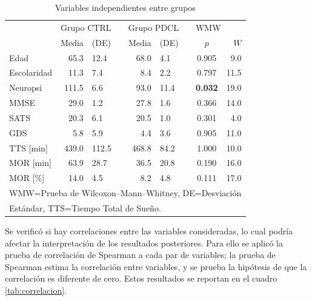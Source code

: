 \documentclass[12pt,letterpaper]{book}
\begin{document}
\begin{table}
\centering
\caption{Variables independientes entre grupos}
\begin{tabular}{lrlcrlccr}
\toprule
 & \multicolumn{2}{l}{Grupo CTRL} & \phantom{.} & \multicolumn{2}{l}{Grupo PDCL} 
 & \phantom{.} & \multicolumn{2}{l}{WMW}
 \\
\cmidrule{2-3} \cmidrule{5-6} \cmidrule{8-9}
            & Media & (DE)  & & Media & (DE) & & $p$ & $W$ \\
\midrule
Edad        &  65.3 &  12.4 & &  68.0 &  4.1 & &    0.905 &  9.0  \\
Escolaridad &  11.3 &   7.4 & &   8.4 &  2.2 & &    0.797 & 11.5 \\
Neuropsi    & 111.5 &   6.6 & &  93.0 & 11.4 & &\bf 0.032 & 19.0 \\
MMSE        &  29.0 &   1.2 & &  27.8 &  1.6 & &    0.366 & 14.0 \\
SATS        &  20.3 &   6.1 & &  20.5 &  1.0 & &    0.301 &  4.0  \\
GDS         &   5.8 &   5.9 & &   4.4 &  3.6 & &    0.905 & 11.0 \\
TTS [min]   & 439.0 & 112.5 & & 468.8 & 84.2 & &    1.000 & 10.0 \\
MOR [min]   &  63.9 &  28.7 & &  36.5 & 20.8 & &    0.190 & 16.0 \\
MOR [\%]    &  14.0 &   4.5 & &   8.2 &  4.8 & &    0.111 & 17.0 \\
\bottomrule 
\multicolumn{9}{l}{WMW=Prueba de Wilcoxon--Mann--Whitney, DE=Desviación}\\
\multicolumn{9}{l}{Estándar, TTS=Tiempo Total de Sueño.}
\end{tabular} 
\label{tab:var_wilcox}
\end{table}

Se verificó si hay correlaciones entre las variables consideradas, lo cual podría afectar la interpretación de los resultados posteriores.
%
Para ello se aplicó la prueba de correlación de Spearman a cada par de variables; la prueba de Spearman estima la correlación entre variables, y se prueba la hipótesis de que la correlación es diferente de cero.
%
Estos resultados se reportan en el cuadro \ref{tab:correlacion}.
\end{document}
